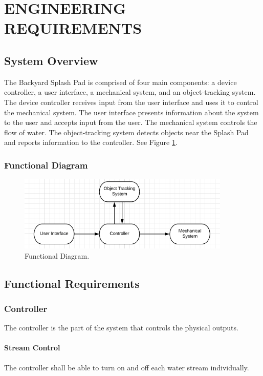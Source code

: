 \section{ENGINEERING REQUIREMENTS}

\subsection{System Overview} 
The Backyard Splash Pad is comprised of four main components: a device controller, a user interface, a mechanical system, and an object-tracking system. 
The device controller receives input from the user interface and uses it to control the mechanical system.
The user interface presents information about the system to the user and accepts input from the user.
The mechanical system controls the flow of water. 
The object-tracking system detects objects near the Splash Pad and reports information to the controller. 
See Figure \ref{fig:functional_diagram}.

\subsubsection{Functional Diagram}

\begin{figure}[h]
\centering
\includegraphics[width=0.9\textwidth]{Functional_Diagram.png}
\caption{\label{fig:functional_diagram}Functional Diagram.}
\end{figure}

\subsection{Functional Requirements}

\subsubsection{Controller}
The controller is the part of the system that controls the physical outputs. 

\paragraph{Stream Control}
The controller shall be able to turn on and off each water stream individually.

